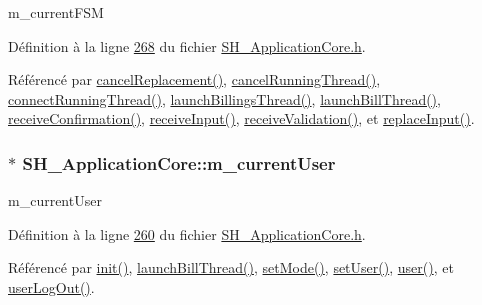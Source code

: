 m\-\_\-current\-F\-S\-M 



Définition à la ligne \hyperlink{SH__ApplicationCore_8h_source_l00268}{268} du fichier \hyperlink{SH__ApplicationCore_8h_source}{S\-H\-\_\-\-Application\-Core.\-h}.



Référencé par \hyperlink{classSH__ApplicationCore_a5b788738972737e1d9b52daeb41e8788}{cancel\-Replacement()}, \hyperlink{classSH__ApplicationCore_af50ebbfed4c12ad7d69cc78f4b0d0d85}{cancel\-Running\-Thread()}, \hyperlink{classSH__ApplicationCore_a3a10c2d662707140340d7a827d119c8d}{connect\-Running\-Thread()}, \hyperlink{classSH__ApplicationCore_a30738281acefd721fe9d06db46dcf123}{launch\-Billings\-Thread()}, \hyperlink{classSH__ApplicationCore_a17a048025bc51a96663029e58c722741}{launch\-Bill\-Thread()}, \hyperlink{classSH__ApplicationCore_a942eacab69b9fe54442591c07773c908}{receive\-Confirmation()}, \hyperlink{classSH__ApplicationCore_ae53ffaee0269f03c3c938595b9b4b39f}{receive\-Input()}, \hyperlink{classSH__ApplicationCore_af450727db378ebec9ec61457b2e13664}{receive\-Validation()}, et \hyperlink{classSH__ApplicationCore_ae8bcd097ea219fc9a54f7d0d9ff9c335}{replace\-Input()}.

\hypertarget{classSH__ApplicationCore_aa61720acee7e06e9828c570e8190304a}{
\subsubsection[{m\-\_\-current\-User}]{$\ast$ S\-H\-\_\-\-Application\-Core\-::m\-\_\-current\-User\hspace{0.3cm}{\ttfamily [private]}}}\label{classSH__ApplicationCore_aa61720acee7e06e9828c570e8190304a}


m\-\_\-current\-User 



Définition à la ligne \hyperlink{SH__ApplicationCore_8h_source_l00260}{260} du fichier \hyperlink{SH__ApplicationCore_8h_source}{S\-H\-\_\-\-Application\-Core.\-h}.



Référencé par \hyperlink{classSH__ApplicationCore_ab50397fef5fa4a514e0a1a0443b886ce}{init()}, \hyperlink{classSH__ApplicationCore_a17a048025bc51a96663029e58c722741}{launch\-Bill\-Thread()}, \hyperlink{classSH__ApplicationCore_aeb87d289ccc9c8209928f23cf8a02ead}{set\-Mode()}, \hyperlink{classSH__ApplicationCore_a83d2df40550a95586e70a08833dc5e5f}{set\-User()}, \hyperlink{classSH__ApplicationCore_aa154f69097fb07514b300f9c8f189da9}{user()}, et \hyperlink{classSH__ApplicationCore_abe6683bdada7ecf979b74656748be106}{user\-Log\-Out()}.

